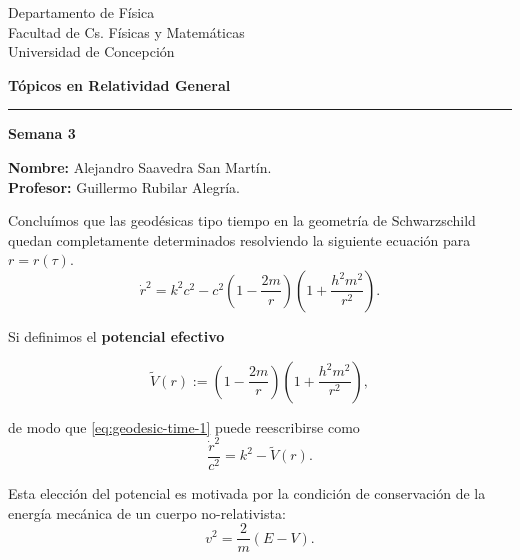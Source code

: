 \documentclass[letterpaper,11pt]{article}
\begin{document}
\pagestyle{plain}

\begin{flushleft}\vspace{-2cm}
Departamento de Física \\
Facultad de Cs. Físicas y Matemáticas\\
Universidad de Concepción
\end{flushleft}

\begin{flushright}\vspace{-1.5cm}
\textbf{Tópicos en Relatividad General} 
\end{flushright}



\rule{\linewidth}{0.1mm}

\begin{center}
\textbf{\LARGE Semana 3}
\end{center}

\begin{flushleft}
\textbf{Nombre:} Alejandro Saavedra San Martín. \\
\textbf{Profesor:} Guillermo Rubilar Alegría.
\end{flushleft}

Concluímos que las geodésicas tipo tiempo en la geometría de Schwarzschild quedan completamente determinados resolviendo la siguiente ecuación para $r = r(\tau)$.
\begin{equation} \label{eq:geodesic-time-1}
\dot{r}^2 = k^2 c^2 - c^2 \left(1 - \frac{2m}{r}\right) \left( 1 + \frac{h^2m^2}{r^2} \right).
\end{equation}

Si definimos el \textbf{potencial efectivo}
\begin{shaded}
\begin{equation}
\tilde{V}(r) := \left( 1 - \frac{2m}{r}\right) \left(1 + \frac{h^2m^2}{r^2} \right),
\end{equation}
\end{shaded}

de modo que \eqref{eq:geodesic-time-1}
 puede reescribirse como
 \begin{equation} \label{eq:geodesic-time-2}
 	\frac{\dot{r}^2}{c^2} = k^2 - \tilde{V}(r).
 \end{equation}
 
 Esta elección del potencial es motivada por la condición de conservación de la energía mecánica de un cuerpo no-relativista:
\begin{equation}
 v^2 = \frac{2}{m}(E-V). 
\end{equation}
 
\end{document}
